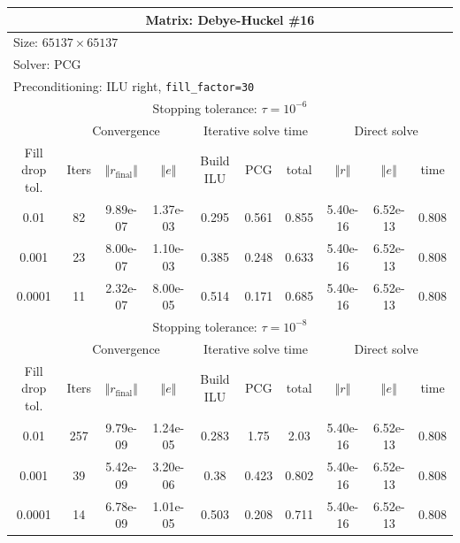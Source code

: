 \documentclass[oneside,final]{amsart}  %
\begin{document}
\begin{tabular}{|c|c|c|c|c|c|c|c|c|c|}
\hline
\multicolumn{10}{|c|}{Matrix: Debye-Huckel \#16}\tabularnewline
\hline
  \multicolumn{10}{|l|}{Size: $65137\times65137$}\tabularnewline
\hline
\multicolumn{10}{|l|}{Solver: PCG}\tabularnewline
\hline
\multicolumn{10}{|l|}{Preconditioning: ILU right, \texttt{fill\_factor=30}}\tabularnewline
\hline
\hline
\multicolumn{10}{|c|}{Stopping tolerance: $\tau=10^{-6}$}\tabularnewline
\hline
\hline
 & \multicolumn{3}{c|}{Convergence} & \multicolumn{3}{c|}{Iterative solve time} & \multicolumn{3}{c|}{Direct solve}\tabularnewline
\hline
Fill drop tol.  & Iters & $\left\Vert r_{\text{final}}\right\Vert $  & $\left\Vert e\right\Vert $  & Build ILU  & PCG  & total  & $\left\Vert r\right\Vert $ & $\left\Vert e\right\Vert $  & time\tabularnewline
\hline
  0.01 & 82 & 9.89e-07 & 1.37e-03 &      0.295 &      0.561 &      0.855 & 5.40e-16 & 6.52e-13 &      0.808\\
  \hline
  0.001 & 23 & 8.00e-07 & 1.10e-03 &      0.385 &      0.248 &      0.633 & 5.40e-16 & 6.52e-13 &      0.808\\
  \hline
  0.0001 & 11 & 2.32e-07 & 8.00e-05 &      0.514 &      0.171 &      0.685 & 5.40e-16 & 6.52e-13 &      0.808\\
  \hline
\hline
\multicolumn{10}{|c|}{Stopping tolerance: $\tau=10^{-8}$}\tabularnewline
\hline
\hline
 & \multicolumn{3}{c|}{Convergence} & \multicolumn{3}{c|}{Iterative solve time} & \multicolumn{3}{c|}{Direct solve }\tabularnewline
\hline
Fill drop tol.  & Iters  & $\left\Vert r_{\text{final}}\right\Vert $  & $\left\Vert e\right\Vert $ & Build ILU  & PCG  & total  & $\left\Vert r\right\Vert $  & $\left\Vert e\right\Vert $  & time\tabularnewline
\hline
  0.01 & 257 & 9.79e-09 & 1.24e-05 &      0.283 &       1.75 &       2.03 & 5.40e-16 & 6.52e-13 &      0.808\\
  \hline
  0.001 & 39 & 5.42e-09 & 3.20e-06 &       0.38 &      0.423 &      0.802 & 5.40e-16 & 6.52e-13 &      0.808\\
  \hline
  0.0001 & 14 & 6.78e-09 & 1.01e-05 &      0.503 &      0.208 &      0.711 & 5.40e-16 & 6.52e-13 &      0.808\\
  \hline
\end{tabular}
\end{document}
